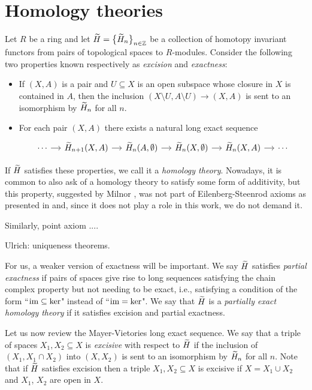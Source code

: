 
\section{Homology theories} \label{s:homology}

Let $R$ be a ring and let $\widetilde{H} = \big\{ \widetilde{H}_{n} \big\}_{n \in \mathbb{Z}}$ be a collection of homotopy invariant functors from pairs of topological spaces to $R$-modules.
Consider the following two properties known respectively as \textit{excision} and \textit{exactness}:
\begin{itemize}
	\item If $(X,A)$ is a pair and $U \subseteq X$ is an open subspace whose closure in $X$ is contained in $A$, then the inclusion $(X \setminus U, A \setminus U) \to (X, A)$ is sent to an isomorphism by $\widetilde{H}_{n}$ for all $n$.
	\item For each pair $(X,A)$ there exists a natural long exact sequence
	\begin{equation*}
    \begin{tikzcd}[column sep = small]
	\cdots \arrow[r] & \H_{n+1}(X,A) \arrow[r] & \H_{n}(A, \emptyset) \arrow[r] & \H_{n}(X, \emptyset) \arrow[r] & \H_{n}(X,A) \arrow[r] & \cdots
	\end{tikzcd}
	\end{equation*}
\end{itemize}

If $\widetilde{H}$ satisfies these properties, we call it a \emph{homology theory}.
Nowadays, it is common to also ask of a homology theory to satisfy some form of additivity, but this property, suggested by Milnor \cite{MR159327}, was not part of Eilenberg-Steenrod axioms as presented in \cite[Chapter I]{MR0050886} and,
since it does not play a role in this work, we do not demand it.

Similarly, point axiom ....

Ulrich: uniqueness theorems.

For us, a weaker version of exactness will be important.
We say $\widetilde{H}$ satisfies \textit{partial exactness} if pairs of spaces give rise to long sequences satisfying the chain complex property but not needing to be exact, i.e., satisfying a condition of the form ``$\operatorname{im} \subseteq \ker$" instead of ``$\operatorname{im} = \ker$".
We say that $\widetilde{H}$ is a \emph{partially exact homology theory} if it satisfies excision and partial exactness.

Let us now review the Mayer-Vietories long exact sequence.
We say that a triple of spaces $X_{1}, X_{2} \subseteq X$ is \emph{excisive} with respect to $\widetilde{H}$ if the inclusion of $(X_{1}, X_{1} \cap X_{2})$ into $(X, X_{2})$ is sent to an isomorphism by $\widetilde{H}_{n}$ for all $n$.
Note that if $\widetilde{H}$ satisfies excision then a triple $X_{1}, X_{2} \subseteq X$ is excisive if $X = X_{1} \cup X_{2}$ and $X_{1}$, $X_{2}$ are open in $X$.

